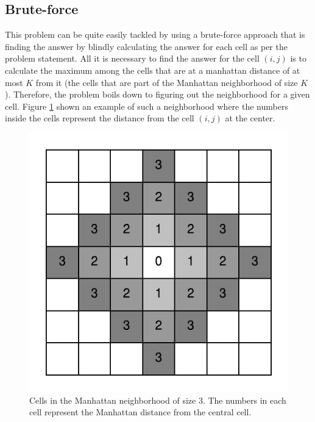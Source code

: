 \subsection{Brute-force}
\label{max_manhattan:sec:bruteforce}
This problem can be quite easily tackled by using a brute-force approach that is finding the answer by blindly calculating the answer for each cell as per the problem statement. 
All it is necessary to find the answer for the cell $(i,j)$ is to calculate the maximum among the cells that are at a manhattan distance of at most $K$ from it (the cells that are part of the Manhattan
neighborhood of size $K$). Therefore, the problem boils down to figuring out the neighborhood for a
given cell. Figure \ref{fig:max_manhattan:neighborhood} shown an example of such a neighborhood
where the numbers inside the cells represent the distance from the cell $(i,j)$ at the center. 
\begin{figure}
    \centering
    \includegraphics[width=\textwidth]{sources/max_manhattan/images/neighborhood}
    \caption[Cells in the Manhattan neighborhood of size $3$.]{Cells in the Manhattan neighborhood
    of size $3$. The numbers in each cell represent the Manhattan distance from the central cell.}
    \label{fig:max_manhattan:neighborhood}
\end{figure}
